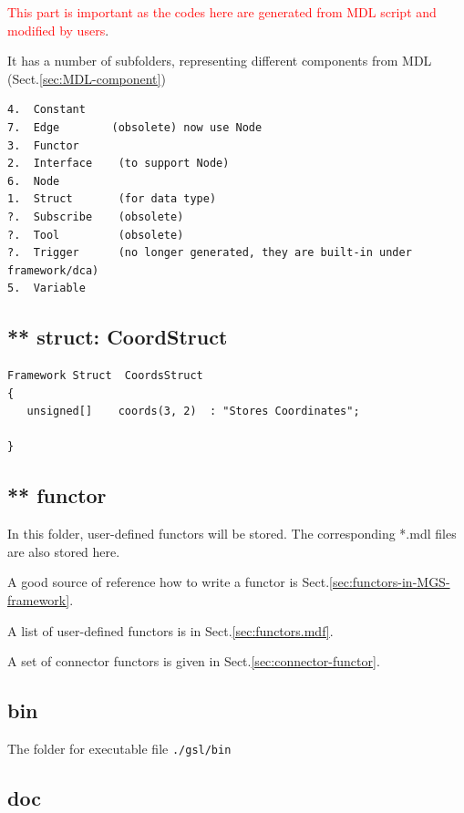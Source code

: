 \textcolor{red}{This part is important as the codes here are generated from MDL
script and modified by users}.

It has a number of subfolders, representing different components from MDL
(Sect.\ref{sec:MDL-component})

\begin{verbatim}
4.	Constant
7.	Edge        (obsolete) now use Node
3.	Functor
2.	Interface    (to support Node)
6.	Node
1.	Struct       (for data type)
?.  Subscribe    (obsolete)
?.  Tool         (obsolete)
?.  Trigger      (no longer generated, they are built-in under framework/dca)
5.	Variable
\end{verbatim}

\subsection{** struct: CoordStruct}
\label{sec:CoordStruct-struct}

\begin{verbatim}
Framework Struct  CoordsStruct 
{
   unsigned[]    coords(3, 2)  : "Stores Coordinates";

}
\end{verbatim}




\subsection{ ** functor}
\label{sec:functor-location-of-user-defined-functor-creator-in-GSL}

In this folder, user-defined functors will be stored.
The corresponding *.mdl files are also stored here.

A good source of reference how to write a functor is
Sect.\ref{sec:functors-in-MGS-framework}. 

A list of user-defined functors is in Sect.\ref{sec:functors.mdf}.

A set of connector functors is given in Sect.\ref{sec:connector-functor}.

\subsection{bin}

The folder for executable file \verb!./gsl/bin!

\subsection{doc}

